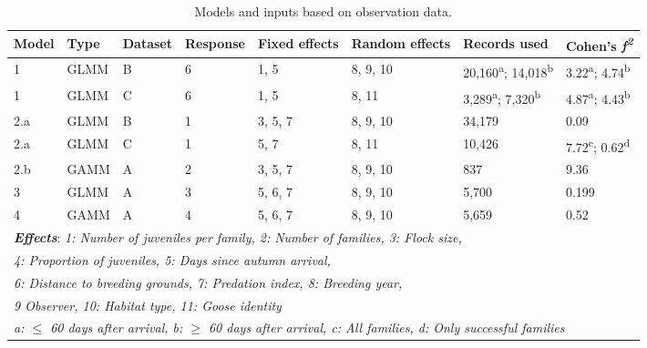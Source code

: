 \documentclass[10pt,twocolumn]{paper}
\begin{document}
\begin{table}[H]
\begin{tabular}{l*7l}
\toprule
Model & Type & Dataset & Response & Fixed effects & Random effects & Records used & Cohen's \emph{f\textsuperscript{2}}\\
\midrule
1 & GLMM & B & 6 & 1, 5 & 8, 9, 10 & 20,160\textsuperscript{a}; 14,018\textsuperscript{b} & 3.22\textsuperscript{a}; 4.74\textsuperscript{b}\\

1 & GLMM & C & 6 & 1, 5 & 8, 11 & 3,289\textsuperscript{a}; 7,320\textsuperscript{b} & 4.87\textsuperscript{a}; 4.43\textsuperscript{b}\\

2.a & GLMM & B & 1 & 3, 5, 7 & 8, 9, 10 & 34,179 & 0.09\\

2.a & GLMM & C & 1 & 5, 7 & 8, 11 & 10,426 & 7.72\textsuperscript{c}; 0.62\textsuperscript{d} \\

2.b & GAMM & A & 2 & 3, 5, 7 & 8, 9, 10 & 837 & 9.36\\

3 & GLMM & A & 3 & 5, 6, 7 & 8, 9, 10 & 5,700 & 0.199\\

4 & GAMM & A & 4 & 5, 6, 7 & 8, 9, 10 & 5,659 & 0.52\\\midrule

\multicolumn{8}{l}{\textbf{\emph{Effects}}: \emph{1: Number of juveniles per family, 2: Number of families, 3: Flock size,}} \\
\multicolumn{8}{l}{\emph{4: Proportion of juveniles, 5: Days since autumn arrival,}} \\
\multicolumn{8}{l}{\emph{6: Distance to breeding grounds, 7: Predation index, 8: Breeding year,}} \\
\multicolumn{8}{l}{\emph{9 Observer, 10: Habitat type, 11: Goose identity}} \\
\midrule
\multicolumn{8}{l}{\emph{a: \ensuremath{\le} 60 days after arrival, b: \ensuremath{\ge} 60 days after arrival, c: All families, d: Only successful families}} \\
\bottomrule
\end{tabular}
\caption{Models and inputs based on observation data.}
\end{table}
\end{document}
